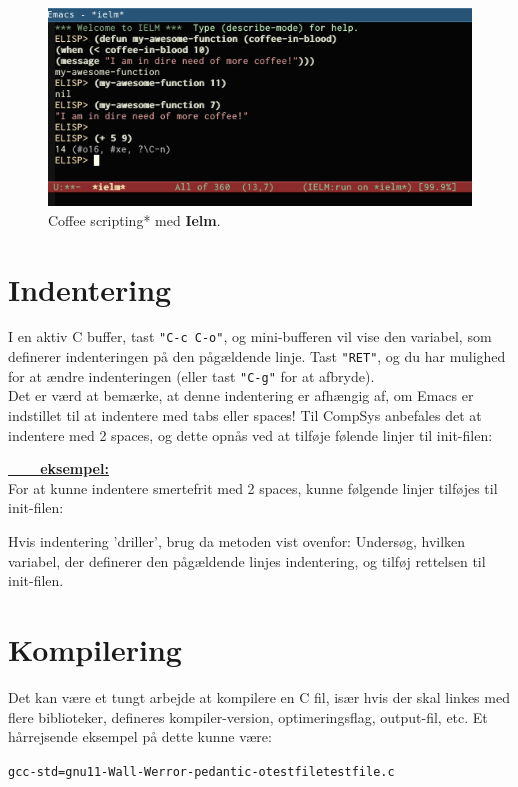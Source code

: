 \documentclass[a4paper, 9pt]{article}
\newcommand{\key}[1]{\texttt{"#1"}}
\newcommand{\example}[1]{\vspace{3mm}\noindent\textbf{\underline{\ \ \ \ #1}}\vspace{2mm}\\}
\newcommand{\lstline}{\vspace{-3mm}\hrulefill\vspace{2mm}\newline}
\newcommand{\customlisting}[3]{\lstline}
\begin{document}
\begin{figure}
\centering
\includegraphics[width=12cm]{ielm-in-action.png}
\caption{\small *Coffee scripting* med \textbf{Ielm}.}
\end{figure}


\newpage
\section{Indentering}
I en aktiv C buffer, tast \key{C-c C-o}, og mini-bufferen vil vise den variabel, som definerer indenteringen på den pågældende linje. Tast \key{RET}, og du har mulighed for at ændre indenteringen (eller tast \key{C-g} for at afbryde).\\

Det er værd at bemærke, at denne indentering er afhængig af, om Emacs er indstillet til at indentere med tabs eller spaces! Til CompSys anbefales det at indentere med 2 spaces, og dette opnås ved at tilføje følende linjer til init-filen:

\customlisting{ELisp}{init.el}{fix-your-indentation.el}

\example{eksempel:}
For at kunne indentere smertefrit med 2 spaces, kunne følgende linjer tilføjes til init-filen:

\customlisting{ELisp}{init.el}{indentation-style.el}

\noindent
Hvis indentering 'driller', brug da metoden vist ovenfor: Undersøg, hvilken variabel, der definerer den pågældende linjes indentering, og tilføj rettelsen til init-filen.


\newpage
\section{Kompilering}
Det kan være et tungt arbejde at kompilere en C fil, især hvis der skal linkes med flere biblioteker, defineres kompiler-version, optimeringsflag, output-fil, etc. Et hårrejsende eksempel på dette kunne være:
\vspace{2mm}\begin{alltt}\footnotesize\centering
gcc -std=gnu11 -Wall -Werror -pedantic -o testfile testfile.c
\end{alltt}\vspace{4mm}
\end{document}
